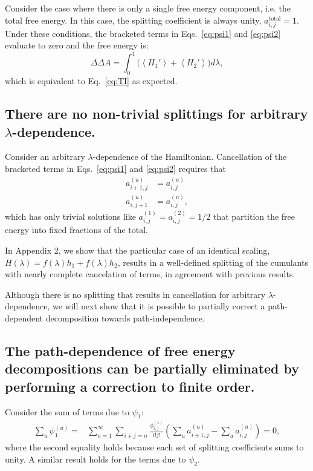 \documentclass{article}
\begin{document}
Consider the case where there is only a single free energy component, i.e. the total free energy. In this case, the splitting coefficient is always unity, $a_{i,j}^\mathrm{total}=1$. Under these conditions, the bracketed terms in Eqs.~\ref{eq:psi1} and \ref{eq:psi2} evaluate to zero and the free energy is:
\begin{equation}
\Delta\Delta A = \int_0^1 \bigg(
	\left\langle H_1' \right\rangle +
    \left\langle H_2' \right\rangle
\bigg) d\lambda,
\end{equation}
which is equivalent to Eq.~\ref{eq:TI} as expected.





\subsection{There are no non-trivial splittings for arbitrary $\lambda$-dependence.}

Consider an arbitrary $\lambda$-dependence of the Hamiltonian. Cancellation of the bracketed terms in Eqs.~\ref{eq:psi1} and \ref{eq:psi2} requires that
\begin{align*}
a_{i+1,j}^{(u)} &= a_{i,j}^{(u)} \\
a_{i,j+1}^{(u)} &= a_{i,j}^{(u)},
\end{align*}
which has only trivial solutions like $a_{i,j}^{(1)} = a_{i,j}^{(2)} = 1/2$ that partition the free energy into fixed fractions of the total.

In Appendix 2, we show that the particular case of an identical scaling, $H(\lambda) = f(\lambda)h_1 + f(\lambda)h_2$, results in a well-defined splitting of the cumulants with nearly complete cancelation of terms, in agreement with previous results.

Although there is no splitting that results in cancellation for arbitrary $\lambda$-dependence, we will next show that it is possible to partially correct a path-dependent decomposition towards path-independence.





\subsection{The path-dependence of free energy decompositions can be partially eliminated by performing a correction to finite order.}

Consider the sum of terms due to $\psi_1$:
\begin{align*}
\sum_u \psi_1^{(u)} =&
	\sum_{n=1}^{\infty}
    \sum_{i+j=n}
        \frac{\phi_{i,j}^{(1)}}{i!j!}
        \left(
        		\sum_u a_{i+1,j}^{(u)} -
        		\sum_u a_{i,j}^{(u)}
        \right) = 0,
\end{align*}
where the second equality holds because each set of splitting coefficients sums to unity. A similar result holds for the terms due to $\psi_2$.
\end{document}
